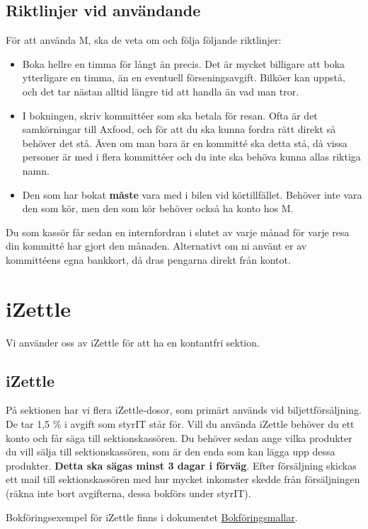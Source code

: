 \documentclass{article}
\begin{document}
\subsection{Riktlinjer vid användande}
För att använda M, ska de veta om och följa följande riktlinjer:
\begin{itemize}
    \item Boka hellre en timma för långt än precis. Det är mycket billigare att boka ytterligare en timma, än en eventuell förseningsavgift. Bilköer kan uppstå, och det tar nästan alltid längre tid att handla än vad man tror. 
    \item I bokningen, skriv kommittéer som ska betala för resan. Ofta är det samkörningar till Axfood, och för att du ska kunna fordra rätt direkt så behöver det stå. Även om man bara är en kommitté ska detta stå, då vissa personer är med i flera kommittéer och du inte ska behöva kunna allas riktiga namn. 
    \item Den som har bokat \textbf{måste} vara med i bilen vid körtillfället. Behöver inte vara den som kör, men den som kör behöver också ha konto hos M. 
\end{itemize}
Du som kassör får sedan en internfordran i slutet av varje månad för varje resa din kommitté har gjort den månaden. Alternativt om ni använt er av kommittéens egna bankkort, då dras pengarna direkt från kontot.

\section{iZettle}
\label{sec:izettle-swish}
Vi använder oss av iZettle för att ha en kontantfri sektion. 
\subsection{iZettle}
På sektionen har vi flera iZettle-dosor, som primärt används vid biljettförsäljning. De tar 1,5 \% i avgift som styrIT står för. Vill du använda iZettle behöver du ett konto och får säga till sektionskassören. Du behöver sedan ange vilka produkter du vill sälja till sektionskassören, som är den enda som kan lägga upp dessa produkter. \textbf{Detta ska sägas minst 3 dagar i förväg}. Efter försäljning skickas ett mail till sektionskassören med hur mycket inkomster skedde från försäljningen (räkna inte bort avgifterna, dessa bokförs under styrIT).

Bokföringsexempel för iZettle finns i dokumentet \href{https://styrit.chalmers.it/wp-content/uploads/bokforingsmall.pdf}{Bokföringsmallar}. 
\end{document}
